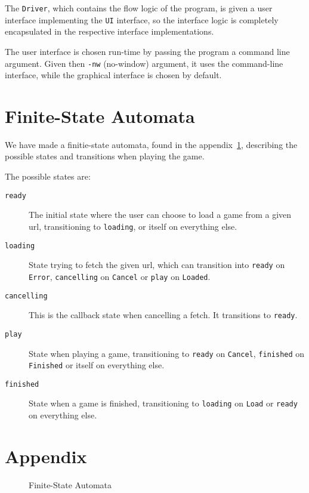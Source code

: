\documentclass{article}
\begin{document}
The {\tt Driver}, which contains the flow logic of the program, is given a user interface implementing the {\tt UI} interface, so the interface logic is completely encapsulated in the respective interface implementations.

The user interface is chosen run-time by passing the program a command line argument. Given then {\tt -nw} (no-window) argument, it uses the command-line interface, while the graphical interface is chosen by default.

\section{Finite-State Automata}
\label{sec:fsa}
We have made a finitie-state automata, found in the appendix~\ref{fig:fsa}, describing the possible states and transitions when playing the game.

The possible states are:
\begin{description}
\item[{\tt ready}] The initial state where the user can choose to load a game from a given url, transitioning to {\tt loading}, or itself on everything else.
\item[{\tt loading}] State trying to fetch the given url, which can transition into {\tt ready} on {\tt Error}, {\tt cancelling} on {\tt Cancel} or {\tt play} on {\tt Loaded}.
\item[{\tt cancelling}] This is the callback state when cancelling a fetch. It transitions to {\tt ready}.
\item[{\tt play}] State when playing a game, transitioning to {\tt ready} on {\tt Cancel}, {\tt finished} on {\tt Finished} or itself on everything else.
\item[{\tt finished}] State when a game is finished, transitioning to {\tt loading} on {\tt Load} or {\tt ready} on everything else.
\end{description}
\clearpage
\section{Appendix}
\begin{figure}[H]
\label{fig:fsa}

\caption{Finite-State Automata}
\end{figure}
\end{document}
